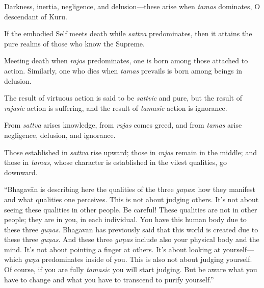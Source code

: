 {Darkness, inertia, negligence, and delusion---these arise when \textit{tamas} dominates, O descendant of Kuru.}

{If the embodied Self meets death while \textit{sattva} predominates, then it attains the pure realms of those who know the Supreme.}

{Meeting death when \textit{rajas} predominates, one is born among those attached to action. Similarly, one who dies when \textit{tamas} prevails is born among beings in delusion.}

{The result of virtuous action is said to be \textit{sattvic} and pure, but the result of \textit{rajasic} action is suffering, and the result of \textit{tamasic} action is ignorance.}

{From \textit{sattva} arises knowledge, from \textit{rajas} comes greed, and from \textit{tamas} arise negligence, delusion, and ignorance.}

{Those established in \textit{sattva} rise upward; those in \textit{rajas} remain in the middle; and those in \textit{tamas}, whose character is established in the vilest qualities, go downward.}

\enquote{Bhagavān is describing here the qualities of the three \textit{guṇas}: how they manifest and what qualities one perceives. This is not about judging others. It’s not about seeing these qualities in other people. Be careful! These qualities are not in other people; they are in you, in each individual. You have this human body due to these three \textit{guṇas}. Bhagavān has previously said that this world is created due to these three \textit{guṇas}. And these three \textit{guṇas} include also your physical body and the mind. It’s not about pointing a finger at others. It’s about looking at yourself---which \textit{guṇa} predominates inside of you. This is also not about judging yourself. Of course, if you are fully \textit{tamasic} you will start judging. But be aware what you have to change and what you have to transcend to purify yourself.}


